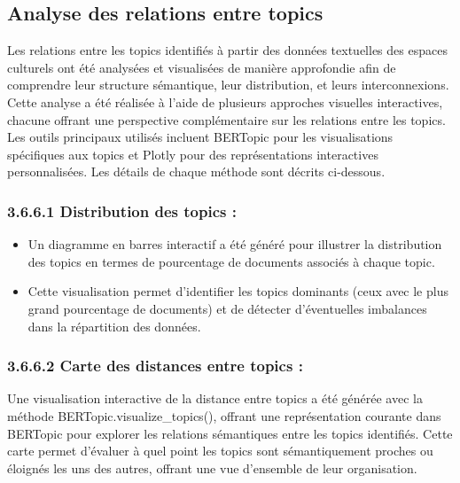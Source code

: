 \documentclass[mstat,12pt]{unswthesis}
\begin{document}
\subsection{Analyse des relations entre topics}

Les relations entre les topics identifiés à partir des données textuelles des espaces culturels ont été analysées et visualisées de manière approfondie afin de comprendre leur structure sémantique, leur distribution, et leurs interconnexions. Cette analyse a été réalisée à l’aide de plusieurs approches visuelles interactives, chacune offrant une perspective complémentaire sur les relations entre les topics. Les outils principaux utilisés incluent BERTopic pour les visualisations spécifiques aux topics et Plotly pour des représentations interactives personnalisées. Les détails de chaque méthode sont décrits ci-dessous.

\bigskip

\subsubsection{3.6.6.1   Distribution des topics :}

\bigskip
\begin{itemize}
    \item 
    Un diagramme en barres interactif a été généré pour illustrer la distribution des topics en termes de pourcentage de documents associés à chaque topic.
    \item 
    Cette visualisation permet d’identifier les topics dominants (ceux avec le plus grand pourcentage de documents) et de détecter d’éventuelles imbalances dans la répartition des données.
\end{itemize}

\bigskip

\subsubsection{3.6.6.2   Carte des distances entre topics : }

\bigskip

Une visualisation interactive de la distance entre topics a été générée avec la méthode BERTopic.visualize\_topics(), offrant une représentation courante dans BERTopic pour explorer les relations sémantiques entre les topics identifiés. Cette carte permet d’évaluer à quel point les topics sont sémantiquement proches ou éloignés les uns des autres, offrant une vue d’ensemble de leur organisation.
\end{document}
